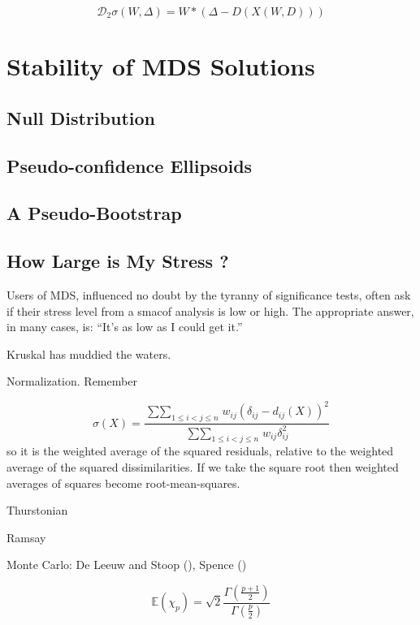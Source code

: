 \documentclass[
  12pt,
  letterpaper,
  DIV=11,
  numbers=noendperiod]{scrreprt}
\theoremstyle{remark}
\begin{document}
\[
\mathcal{D}_2\sigma(W,\Delta)=W*(\Delta-D(X(W,D)))
\]


\chapter{Stability of MDS Solutions}\label{stability}

\section{Null Distribution}\label{null-distribution}

\section{Pseudo-confidence
Ellipsoids}\label{pseudo-confidence-ellipsoids}

\section{A Pseudo-Bootstrap}\label{a-pseudo-bootstrap}

\section{How Large is My Stress ?}\label{how-large-is-my-stress}

Users of MDS, influenced no doubt by the tyranny of significance tests,
often ask if their stress level from a smacof analysis is low or high.
The appropriate answer, in many cases, is: ``It's as low as I could get
it.''

Kruskal has muddied the waters.

Normalization. Remember

\[
\sigma(X)=\frac{\mathop{\sum\sum}_{1\leq i<j\leq n}w_{ij}(\delta_{ij}-d_{ij}(X))^2}{\mathop{\sum\sum}_{1\leq i<j\leq n}w_{ij}\delta_{ij}^2}
\] so it is the weighted average of the squared residuals, relative to
the weighted average of the squared dissimilarities. If we take the
square root then weighted averages of squares become root-mean-squares.

Thurstonian

Ramsay

Monte Carlo: De Leeuw and Stoop
(), Spence
()

\[
\mathbb{E}(\chi_p)=\sqrt{2}\frac{\Gamma(\frac{p+1}{2})}{\Gamma(\frac{p}{2})}
\]
\end{document}
